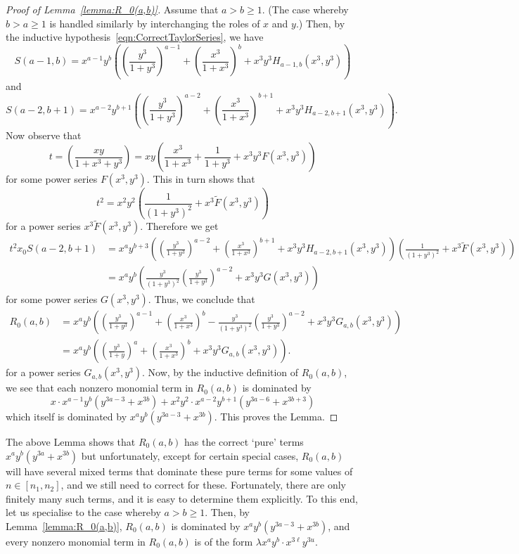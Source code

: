 \documentclass{article}
\begin{document}
\begin{proof}[Proof of Lemma~\ref{lemma:R_0(a,b)}]
    Assume that $a>b\geq 1$. (The case whereby $b> a \geq 1$ is handled similarly by interchanging the roles of $x$ and $y$.) Then, by the inductive hypothesis~\eqref{eqn:CorrectTaylorSeries}, we have 
    \[
    S(a-1,b) = x^{a-1}y^b\left(\left(\frac{y^3}{1+y^3}\right)^{a-1} + \left(\frac{x^3}{1+x^3}\right)^{b} + x^3y^3H_{a-1,b}(x^3,y^3)\right)
    \]
    and 
    \[
    S(a-2,b+1) = x^{a-2}y^{b+1}\left(\left(\frac{y^3}{1+y^3}\right)^{a-2} + \left(\frac{x^3}{1+x^3}\right)^{b+1} + x^3y^3H_{a-2,b+1}(x^3,y^3)\right).
    \]
    Now observe that 
    \[
    t = \left(\frac{xy}{1+x^3+y^3}\right)=xy\left(\frac{x^3}{1+x^3}+\frac{1}{1+y^3}+x^3y^3F(x^3,y^3)\right) 
    \]
    for some power series $F(x^3,y^3)$. This in turn shows that 
    \[
    t^2=x^2y^2\left(\frac{1}{(1+y^3)^2}+x^3\tilde F(x^3,y^3)\right)
    \]
    for a power series $x^3\tilde F(x^3,y^3)$. Therefore we get
    \begin{align*}
    t^2x_0S(a-2,b+1) &=x^{a}y^{b+3}\left(\left(\frac{y^3}{1+y^3}\right)^{a-2} + \left(\frac{x^3}{1+x^3}\right)^{b+1} + x^3y^3H_{a-2,b+1}(x^3,y^3)\right)\left(\frac{1}{(1+y^3)^2}+x^3\tilde F(x^3,y^3)\right)\\
    &=x^{a}y^b\left(\frac{y^3}{(1+y^3)^2}\left(\frac{y^3}{1+y^3}\right)^{a-2}+x^3y^3G(x^3,y^3)\right) 
    \end{align*}
    for some power series $G(x^3,y^3)$. Thus, we conclude that 
    \begin{align*}
    R_0(a,b) &= x^{a}y^b\left(\left(\frac{y^3}{1+y^3}\right)^{a-1} +\left(\frac{x^3}{1+x^3}\right)^{b} -\frac{y^3}{(1+y^3)^2}\left(\frac{y^3}{1+y^3}\right)^{a-2}  + x^3y^3G_{a,b}(x^3,y^3)\right)\\
    &=x^ay^b\left(\left(\frac{y^3}{1+y}\right)^{a}+\left(\frac{x^3}{1+x^3}\right)^{b}+x^3y^3G_{a,b}(x^3,y^3)\right).
    \end{align*}
    for a power series $G_{a,b}(x^3,y^3)$. Now, by the inductive definition of $R_0(a,b)$, we see that each  nonzero monomial term in $R_0(a,b)$ is dominated by 
    \[x\cdot x^{a-1}y^b(y^{3a-3}+x^{3b})+x^2y^2\cdot x^{a-2}y^{b+1}(y^{3a-6}+x^{3b+3})
    \] 
    which itself is dominated by $x^ay^b(y^{3a-3}+x^{3b})$. This proves the Lemma.
\end{proof}
The above Lemma shows that $R_0(a,b)$ has the correct `pure' terms $x^ay^b(y^{3a}+x^{3b})$ but unfortunately, except for certain special cases, $R_0(a,b)$ will have several mixed terms that dominate these pure terms for some values of $n\in [n_1,n_2]$, and we still need to correct for these. Fortunately, there are only finitely many such terms, and it is easy to determine them explicitly. 
To this end, let us specialise to the case whereby $a>b\geq 1$. Then, by Lemma~\ref{lemma:R_0(a,b)}, $R_0(a,b)$ is dominated by $x^ay^b(y^{3a-3}+x^{3b})$, and every nonzero monomial term in $R_0(a,b)$ is of the form $\lambda x^ay^b\cdot x^{3
\ell}y^{3u}$. 
\end{document}
